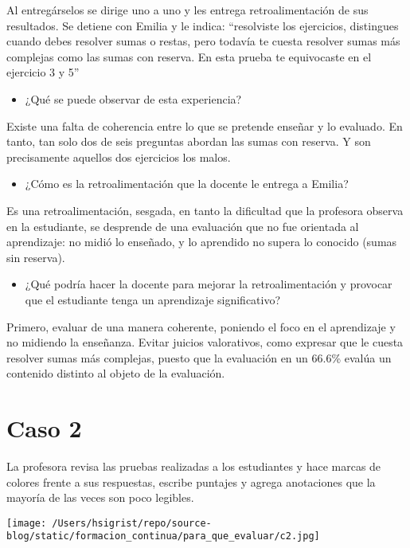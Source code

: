\documentclass[12pt,letterpaper,article,x11names]{memoir}
\begin{document}
Al entregárselos se dirige uno a uno y les entrega retroalimentación de sus resultados. Se detiene con Emilia y le indica: “resolviste los ejercicios, distingues cuando debes resolver sumas o restas, pero todavía te cuesta resolver sumas más complejas como las sumas con reserva. En esta prueba te equivocaste en el ejercicio 3 y 5”

\begin{itemize}
\item ¿Qué se puede observar de esta experiencia?
\end{itemize}
Existe una falta de coherencia entre lo que se pretende enseñar y lo evaluado. En tanto, tan solo dos de seis preguntas abordan las sumas con reserva. Y son precisamente aquellos dos ejercicios los malos.  
\begin{itemize}
\item ¿Cómo es la retroalimentación que la docente le entrega a Emilia?
\end{itemize}
Es una retroalimentación, sesgada, en tanto la dificultad que la profesora observa en la estudiante, se desprende de una evaluación que no fue orientada al aprendizaje: no midió lo enseñado, y lo aprendido no supera lo conocido (sumas sin reserva).
\begin{itemize}
\item ¿Qué podría hacer la docente para mejorar la retroalimentación y provocar que el estudiante tenga un aprendizaje significativo?
\end{itemize}
Primero, evaluar de una manera coherente, poniendo el foco en el aprendizaje y no midiendo la enseñanza. Evitar juicios valorativos, como expresar que le cuesta resolver sumas más complejas, puesto que la evaluación en un 66.6\% evalúa un contenido distinto al objeto de la evaluación.
\section{Caso 2}
\label{sec:org7f57519}
La profesora revisa las pruebas realizadas a los estudiantes y hace marcas de colores frente a sus respuestas, escribe puntajes y agrega anotaciones que la mayoría de las veces son poco legibles.

\begin{center}
\texttt{[image: /Users/hsigrist/repo/source-blog/static/formacion\_continua/para\_que\_evaluar/c2.jpg]}
\end{center}
\end{document}
